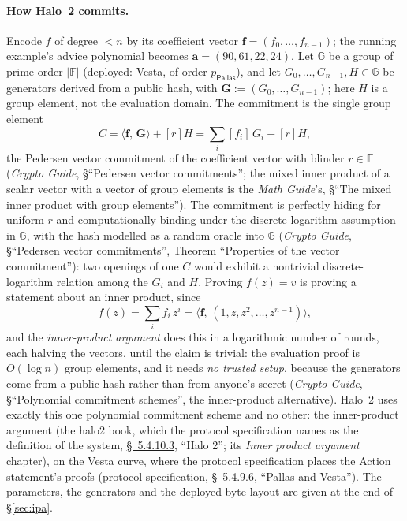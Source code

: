 \documentclass[11pt,a4paper]{article}
\theoremstyle{definition}
\newcommand{\F}{\mathbb{F}}
\newcommand{\G}{\mathbb{G}}
\newcommand{\ip}[2]{\langle #1,\, #2 \rangle}
\newcommand{\Pallas}{\ensuremath{\mathsf{Pallas}}}
\begin{document}
\paragraph{How Halo~2 commits.}
Encode $f$ of degree $< n$ by its coefficient vector
$\mathbf f = (f_0, \dots, f_{n-1})$; the running example's advice
polynomial becomes $\mathbf a = (90, 61, 22, 24)$. Let $\G$ be a group
of prime order $|\F|$ (deployed: Vesta, of order $p_{\Pallas}$), and let
$G_0, \dots, G_{n-1}, H \in \G$ be generators derived from a public hash,
with $\mathbf G := (G_0, \dots, G_{n-1})$; here $H$ is a group element,
not the evaluation domain. The commitment is the single group element
\[
C = \ip{\mathbf f}{\mathbf G} + [r]H = \sum_{i} [f_i]\,G_i + [r]H,
\]
the Pedersen vector commitment of the coefficient vector with blinder
$r \in \F$ (\emph{Crypto Guide}, \S``Pedersen vector commitments''; the
mixed inner product of a scalar vector with a vector of group elements is
the \emph{Math Guide}'s, \S``The mixed inner product with group
elements''). The commitment is perfectly hiding for uniform $r$ and
computationally binding under the discrete-logarithm assumption in $\G$,
with the hash modelled as a random oracle into $\G$
(\emph{Crypto Guide}, \S``Pedersen vector commitments'', Theorem
``Properties of the vector commitment''): two openings of one $C$ would
exhibit a nontrivial discrete-logarithm relation among the $G_i$ and
$H$. Proving $f(z) = v$ is proving a statement about an inner product,
since
\[
f(z) = \sum_{i} f_i\,z^i = \ip{\mathbf f}{(1, z, z^2, \dots, z^{n-1})},
\]
and the \emph{inner-product argument} does this in a logarithmic number
of rounds, each halving the vectors, until the claim is trivial: the
evaluation proof is $O(\log n)$ group elements, and it needs \emph{no trusted
setup}, because the generators come from a public hash rather than from anyone's
secret (\emph{Crypto Guide}, \S``Polynomial commitment schemes'', the
inner-product alternative). Halo~2 uses exactly this one polynomial commitment
scheme and no other: the inner-product argument (the halo2 book, which the
protocol specification names as the definition of the system,
\href{https://zips.z.cash/protocol/protocol.pdf\#halo2}{\S~5.4.10.3},
``Halo 2''; its \emph{Inner product argument} chapter), on the Vesta curve,
where the protocol specification places the Action statement's proofs
(protocol specification,
\href{https://zips.z.cash/protocol/protocol.pdf\#pallasandvesta}{\S~5.4.9.6},
``Pallas and Vesta''). The parameters, the
generators and the deployed byte layout are given at the end of \S\ref{sec:ipa}.
\end{document}
